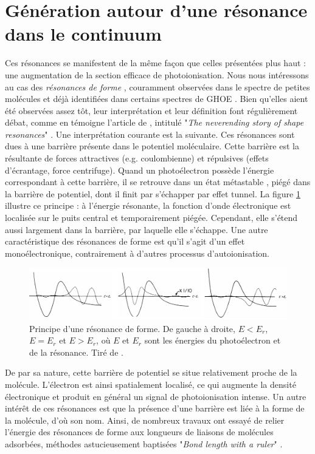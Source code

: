 \section{Génération autour d'une résonance dans le continuum}
Ces résonances se manifestent de la même façon que celles présentées plus haut : une augmentation de la section efficace de photoionisation. Nous nous intéressons au cas des \textit{résonances de forme} , couramment observées dans le spectre de petites molécules et déjà identifiées dans certains spectres de GHOE . Bien qu'elles aient été observées assez tôt, leur interprétation et leur définition font régulièrement débat, comme en témoigne l'article de , intitulé "\textit{The neverending story of shape resonances}" . Une interprétation courante est la suivante. Ces résonances sont dues à une barrière présente dans le potentiel moléculaire. Cette barrière est la résultante de forces attractives (e.g. coulombienne) et répulsives (effets d'écrantage, force centrifuge). Quand un photoélectron possède l'énergie correspondant à cette barrière, il se retrouve dans un état métastable , piégé dans la barrière de potentiel, dont il finit par s'échapper par effet tunnel. La figure \ref{fig:shaperesonance} illustre ce principe : à l'énergie résonante, la fonction d'onde électronique est localisée sur le puits central et temporairement piégée. Cependant, elle s'étend aussi largement dans la barrière, par laquelle elle s'échappe. Une autre caractéristique des résonances de forme est qu'il s'agit d'un effet monoélectronique, contrairement à d'autres processus d'autoionisation.

\begin{figure}[!ht]
\centering
\includegraphics[width=1\columnwidth]{Figures/ResonantArgon/shape_resonance.pdf}%
\caption{Principe d'une résonance de forme. De gauche à droite, $E<E_r$, $E=E_r$ et $E>E_r$, où $E$ et $E_r$ sont les énergies du photoélectron et de la résonance. Tiré de .}
\label{fig:shaperesonance}
\end{figure}

De par sa nature, cette barrière de potentiel se situe relativement proche de la molécule. L'électron est ainsi spatialement localisé, ce qui augmente la densité électronique et produit en général un signal de photoionisation intense. Un autre intérêt de ces résonances est que la présence d'une barrière est liée à la forme de la molécule, d'où son nom. Ainsi, de nombreux travaux ont essayé de relier l'énergie des résonances de forme aux longueurs de liaisons de molécules adsorbées, méthodes astucieusement baptisées "\textit{Bond length with a ruler}" .

